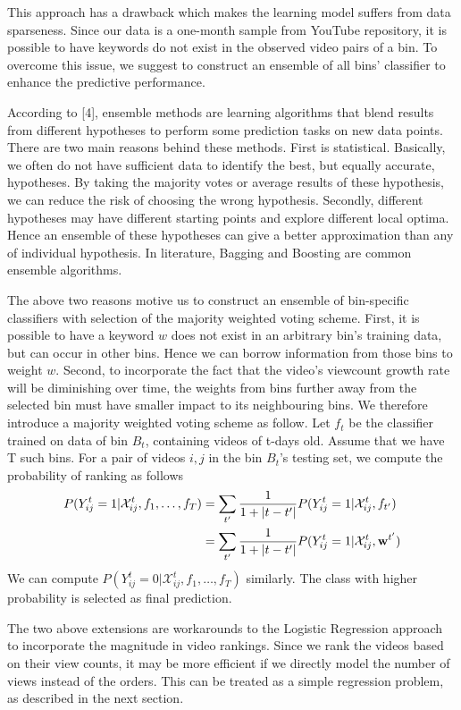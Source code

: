 	This approach has a drawback which makes the learning model suffers from data sparseness. Since our data is a one-month sample from YouTube repository, it is possible to have keywords do not exist in the observed video pairs of a bin. To overcome this issue, we suggest to construct an ensemble of all bins' classifier to enhance the predictive performance. 

	According to [4], ensemble methods are learning algorithms that blend results from different hypotheses to perform some prediction tasks on new data points. There are two main reasons behind these methods. First is statistical. Basically, we often do not have sufficient data to identify the best, but equally accurate, hypotheses. By taking the majority votes or average results of these hypothesis, we can reduce the risk of choosing the wrong hypothesis. Secondly, different hypotheses may have different starting points and explore different local optima. Hence an ensemble of these hypotheses can give a better approximation than any of individual hypothesis. In literature, Bagging and Boosting are common ensemble algorithms. 

	The above two reasons motive us to construct an ensemble of bin-specific classifiers with selection of the majority weighted voting scheme. First, it is possible to have a keyword $w$ does not exist in an arbitrary bin's training data, but can occur in other bins. Hence we can borrow information from those bins to weight $w$. Second, to incorporate the fact that the video's viewcount growth rate will be diminishing over time, the weights from bins further away from the selected bin must have smaller impact to its neighbouring bins. We therefore introduce a majority weighted voting scheme as follow. Let $f_t$ be the classifier trained on data of bin $B_t$, containing videos of t-days old. Assume that we have T such bins. For a pair of videos $i, j$ in the bin $B_t$'s testing set, we compute the probability of ranking as follows
		\begin{align}
			P(Y_{ij}^t = 1 | \mathcal{X}_{ij}^t, f_1, \ldots, f_T) &= \sum_{t'} \frac{1}{1+|t - t'|} P(Y_{ij}^t = 1 | \mathcal{X}_{ij}^t, f_{t'}) \\ \notag 
			&= \sum_{t'} \frac{1}{1+|t - t'|} P(Y_{ij}^t = 1 | \mathcal{X}_{ij}^t, \textbf{w}^{t'})
		\end{align}
		We can compute $P(Y_{ij}^t = 0 | \mathcal{X}_{ij}^t, f_1, \ldots, f_T)$ similarly. The class with higher probability is selected as final prediction. 

	The two above extensions are workarounds to the Logistic Regression approach to incorporate the magnitude in video rankings. Since we rank the videos based on their view counts, it may be more efficient if we directly model the number of views instead of the orders. This can be treated as a simple regression problem, as described in the next section.  